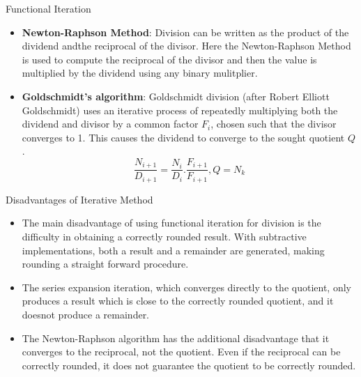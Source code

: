 \documentclass[10pt]{beamer}
\begin{document}
\begin{frame}{Functional Iteration}
\begin{itemize}
\item \textbf{Newton-Raphson Method}: 
Division can be written as the product of the dividend andthe reciprocal of the divisor. Here the Newton-Raphson Method is used to compute the reciprocal of the divisor and then the value is multiplied by the dividend using any binary mulitplier.
\item \textbf{Goldschmidt’s algorithm}:
Goldschmidt division (after Robert Elliott Goldschmidt) uses an iterative process of repeatedly multiplying both the dividend and divisor by a common factor $F_i$, chosen such that the divisor converges to 1. This causes the dividend to converge to the sought quotient $Q$.
\[\frac{N_{i+1}}{D_{i+1}} = \frac{N_{i}}{D_{i}}. \frac{F_{i+1}}{F_{i+1}},Q = N_k \]
\end{itemize}
\end{frame}
\begin{frame}{Disadvantages of Iterative Method}
\begin{itemize}
\item The  main  disadvantage  of  using  functional  iteration  for division  is  the  difficulty  in  obtaining  a  correctly  rounded result. With subtractive implementations, both a result and a  remainder  are  generated,  making  rounding  a  straight forward procedure. 
\item The series expansion iteration, which converges  directly  to  the  quotient,  only  produces  a  result which is close to the correctly rounded quotient, and it doesnot  produce  a  remainder.  
\item The  Newton-Raphson  algorithm has  the  additional  disadvantage  that  it  converges  to  the reciprocal,  not  the  quotient.  Even  if  the  reciprocal  can  be correctly  rounded,  it  does  not  guarantee  the  quotient  to  be correctly rounded.
\end{itemize}
\end{frame}
\end{document}

